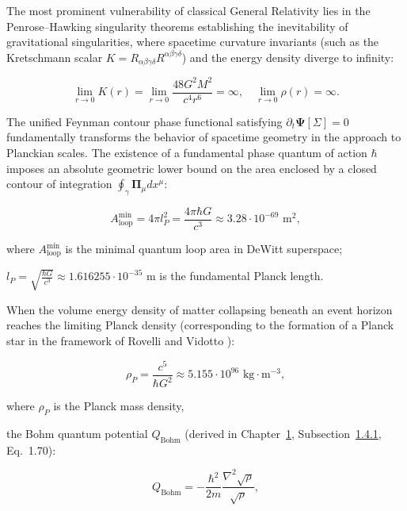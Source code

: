 The most prominent vulnerability of classical General Relativity lies in the Penrose--Hawking singularity theorems establishing the inevitability of gravitational singularities, where spacetime curvature invariants (such as the Kretschmann scalar $K = R_{\alpha\beta\gamma\delta}R^{\alpha\beta\gamma\delta}$) and the energy density diverge to infinity:

\begin{equation}\label{eq:5.51}\tag{5.51}
\lim_{r \to 0} K(r) = \lim_{r \to 0} \frac{48 G^2 M^2}{c^4 r^6} = \infty, \quad \lim_{r \to 0} \rho(r) = \infty.
\end{equation}

The unified Feynman contour phase functional satisfying $\partial_t \mathbf{\Psi}[\Sigma] = 0$ fundamentally transforms the behavior of spacetime geometry in the approach to Planckian scales. The existence of a fundamental phase quantum of action $\hbar$ imposes an absolute geometric lower bound on the area enclosed by a closed contour of integration $\oint_\gamma \mathbf{\Pi}_\mu dx^\mu$:

\begin{equation}\label{eq:5.52}\tag{5.52}
A_{\text{loop}}^{\text{min}} = 4\pi l_P^2 = \frac{4\pi \hbar G}{c^3} \approx 3.28 \cdot 10^{-69}\text{ m}^2,
\end{equation}

where $A_{\text{loop}}^{\text{min}}$ is the minimal quantum loop area in DeWitt superspace;  

$l_P = \sqrt{\frac{\hbar G}{c^3}} \approx 1.616255 \cdot 10^{-35}\text{ m}$ is the fundamental Planck length.

When the volume energy density of matter collapsing beneath an event horizon reaches the limiting Planck density (corresponding to the formation of a Planck star in the framework of Rovelli and Vidotto \cite{ref44}):

\begin{equation}\label{eq:5.53}\tag{5.53}
\rho_P = \frac{c^5}{\hbar G^2} \approx 5.155 \cdot 10^{96}\text{ kg}\cdot\text{m}^{-3},
\end{equation}

where $\rho_P$ is the Planck mass density,

the Bohm quantum potential \cite{ref11} $Q_{\text{Bohm}}$ (derived in Chapter~\hyperref[sec:rozdil1]{1}, Subsection~\hyperref[sec:1.4.1]{1.4.1}, Eq.~1.70):

\begin{equation}\label{eq:5.54}\tag{5.54}
Q_{\text{Bohm}} = - \frac{\hbar^2}{2 m} \frac{\nabla^2 \sqrt{\rho}}{\sqrt{\rho}},
\end{equation}

